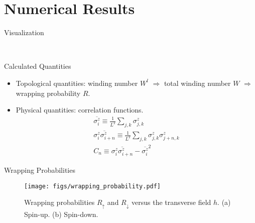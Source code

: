 \documentclass[aspectratio=43]{beamer}
\begin{document}
\section{Numerical Results}
\begin{frame}{Visualization}
  \vspace{-3mm}
  \begin{figure}[htpb]
    \centering
    \hspace{12mm}
    \\
    \vspace{-3mm}
    \hspace{12mm}
  \end{figure}
\end{frame}

\begin{frame}{Calculated Quantities}
  \begin{itemize}
    \item Topological quantities: winding number $W^l$ $\Rightarrow$ total winding number $W$ $\Rightarrow$ wrapping probability $R$.
    \item Physical quantities: correlation functions.
      \begin{gather*}
        \overline{\sigma_i^z} \equiv \frac{1}{L^2}\sum_{j,k}\sigma_{j,k}^z\\
        \overline{\sigma_i^z \sigma_{i+n}^z} \equiv \frac{1}{L^2} \sum_{j,k}\sigma_{j,k}^z \sigma_{j+n,k}^z\\
        C_n \equiv \overline{\sigma_i^z \sigma_{i+n}^z}-\overline{\sigma_i^z}^2
      \end{gather*}
  \end{itemize}
\end{frame}

\begin{frame}{Wrapping Probabilities}
  \begin{figure}[htpb]
    \centering
    \texttt{[image: figs/wrapping\_probability.pdf]}
    \caption{Wrapping probabilities $R_\uparrow$ and $R_\downarrow$ versus the transverse field $h$. (a) Spin-up. (b) Spin-down.}
    \label{fig:wrapping_probability}
  \end{figure}
\end{frame}
\end{document}
